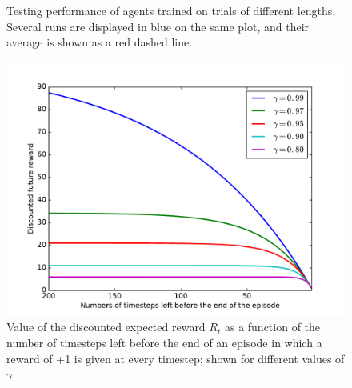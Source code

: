 \begin{figure}
	\centering
	\caption{Testing performance of agents trained on trials of different
	lengths. Several runs are displayed in blue on the same plot, and their
	average is shown as a red dashed line.}
	\label{fig:20permsLR_rewards}
\end{figure}

\begin{figure}
	\centering
	\includegraphics[width=0.8\linewidth]{fig/gamma_impact.pdf}
	\caption{Value of the discounted expected reward $R_t$ as a function
	of the number of timesteps left before the end of an episode in which
	a reward of +1 is given at every timestep; shown for different values
	of $\gamma$.}
	\label{fig:gamma_impact}
\end{figure}

